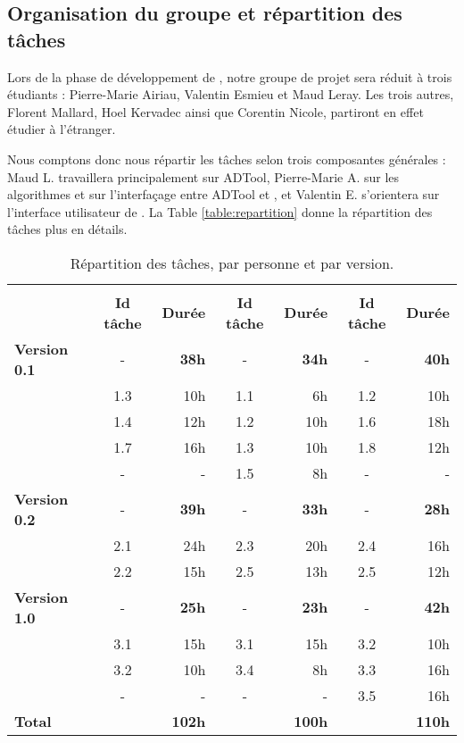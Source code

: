 	\subsection{Organisation du groupe et répartition des tâches}
		Lors de la phase de développement de \glasir{}, notre groupe de projet sera réduit à trois étudiants : Pierre-Marie {\sc Airiau}, Valentin {\sc Esmieu} et Maud {\sc Leray}. Les trois autres, Florent {\sc Mallard}, Hoel {\sc Kervadec} ainsi que Corentin {\sc Nicole}, partiront en effet étudier à l'étranger.
		
		Nous comptons donc nous répartir les tâches selon trois composantes générales : Maud L. travaillera principalement sur ADTool, Pierre-Marie A. sur les algorithmes et sur l'interfaçage entre ADTool et \glasir{}, et Valentin E. s'orientera sur l'interface utilisateur de \glasir{}. La {\sc Table} \ref{table:repartition} donne la répartition des tâches plus en détails.
			


		\begin{table}[H]
			\centering
			\begin{tabular}{|l|c|r||c|r||c|r|}
				\hline
				\multirow{2}{*}{} & \nomRepart{Pierre-Marie A.} & \nomRepart{Valentin E.} & \nomRepartt{Maud L.}\\
				\cline{2-7}
				 & {\bf Id tâche} & {\bf Durée} & {\bf Id tâche} & {\bf Durée} & {\bf Id tâche} & {\bf Durée}\\
				\hline
				{\bf Version 0.1} & - & {\bf 38h} & - & {\bf 34h} & - & {\bf 40h}\\
				 & 1.3 & 10h & 1.1 & 6h & 1.2 & 10h\\
				 & 1.4 & 12h & 1.2 & 10h & 1.6 & 18h\\
				 & 1.7 & 16h & 1.3 & 10h & 1.8 & 12h\\
				 & - & - & 1.5 & 8h & - & -\\
				\hline
				{\bf Version 0.2} & - & {\bf 39h} & - & {\bf 33h} & - & {\bf 28h}\\
				 & 2.1 & 24h & 2.3 & 20h & 2.4 & 16h\\
				 & 2.2 & 15h & 2.5 & 13h & 2.5 & 12h\\
				\hline
				{\bf Version 1.0} & - & {\bf 25h} & - & {\bf 23h} & - & {\bf 42h}\\
				 & 3.1 & 15h & 3.1 & 15h & 3.2 & 10h\\
				 & 3.2 & 10h & 3.4 & 8h & 3.3 & 16h\\
				 & - & - & - & - & 3.5 & 16h\\
				\hline
				{\bf Total} & \multicolumn{2}{r||}{{\bf 102h}} & \multicolumn{2}{r||}{{\bf 100h}} & \multicolumn{2}{r|}{{\bf 110h}}\\
				\hline
			\end{tabular}
			\caption{Répartition des tâches, par personne et par version.}
			\label{table:repartition}
			\label{tab:repartition}
		\end{table}


